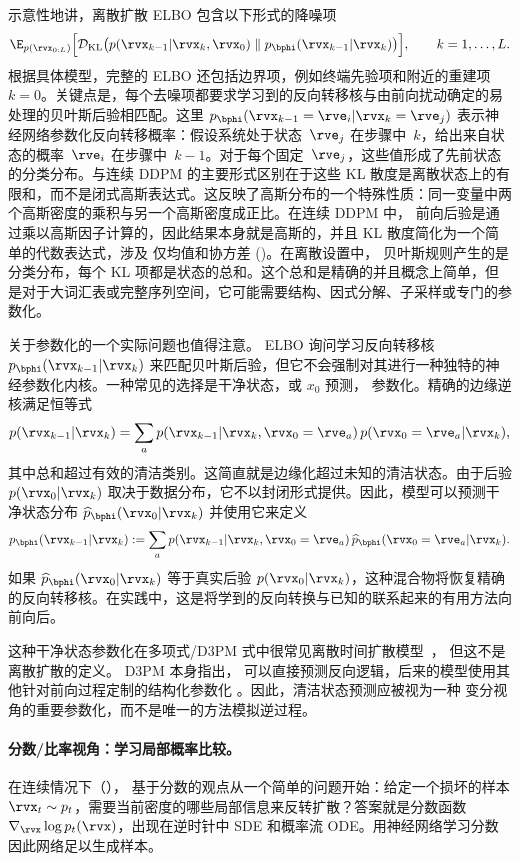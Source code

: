 示意性地讲，离散扩散 ELBO 包含以下形式的降噪项
\[
\E_{p(\rvx_{0:L})}
 \Big[
\mathcal{D}_{\mathrm{KL}} \big(
  p(\rvx_{k-1}|\rvx_k, \rvx_0)
  \;\|\;
  p_{\bphi}(\rvx_{k-1}|\rvx_k)
\big)
\Big],
\qquad k=1,\ldots,L.
\]
根据具体模型，完整的 ELBO 还包括边界项，例如终端先验项和附近的重建项 $k=0$。关键点是，每个去噪项都要求学习到的反向转移核与由前向扰动确定的易处理的贝叶斯后验相匹配。这里 $p_{\bphi}(\rvx_{k-1}=\rve_i|\rvx_k=\rve_j)$ 表示神经网络参数化反向转移概率：假设系统处于状态~$\rve_j$ 在步骤中~$k$，给出来自状态的概率~$\rve_i$ 在步骤中~$k{-}1$。对于每个固定~$\rve_j$，这些值形成了先前状态的分类分布。与连续 DDPM 的主要形式区别在于这些 KL 散度是离散状态上的有限和，而不是闭式高斯表达式。这反映了高斯分布的一个特殊性质：同一变量中两个高斯密度的乘积与另一个高斯密度成正比。在连续 DDPM 中，
前向后验是通过乘以高斯因子计算的，因此结果本身就是高斯的，并且
KL 散度简化为一个简单的代数表达式，涉及
仅均值和协方差 ()。在离散设置中，
贝叶斯规则产生的是分类分布，每个 KL 项都是状态的总和。这个总和是精确的并且概念上简单，但是对于大词汇表或完整序列空间，它可能需要结构、因式分解、子采样或专门的参数化。

关于参数化的一个实际问题也值得注意。 ELBO 询问学习反向转移核 $p_{\bphi}(\rvx_{k-1}|\rvx_k)$ 来匹配贝叶斯后验，但它不会强制对其进行一种独特的神经参数化内核。一种常见的选择是干净状态，或 $x_0$ 预测，
参数化。精确的边缘逆核满足恒等式
\[
p(\rvx_{k-1}|\rvx_k)
=
\sum_{a}
p(\rvx_{k-1}|\rvx_k,\rvx_0=\rve_a)\,
p(\rvx_0=\rve_a|\rvx_k),
\]
其中总和超过有效的清洁类别。这简直就是边缘化超过未知的清洁状态。由于后验 $p(\rvx_0|\rvx_k)$ 取决于数据分布，它不以封闭形式提供。因此，模型可以预测干净状态分布 $\widehat p_{\bphi}(\rvx_0|\rvx_k)$ 并使用它来定义
\[
p_{\bphi}(\rvx_{k-1}|\rvx_k)
:=
\sum_{a}
p(\rvx_{k-1}|\rvx_k,\rvx_0=\rve_a)\,
\widehat p_{\bphi}(\rvx_0=\rve_a|\rvx_k).
\]
如果 $\widehat p_{\bphi}(\rvx_0|\rvx_k)$ 等于真实后验
$p(\rvx_0|\rvx_k)$，这种混合物将恢复精确的反向转移核。在实践中，这是将学到的反向转换与已知的联系起来的有用方法向前向后。

这种干净状态参数化在多项式/D3PM 式中很常见离散时间扩散模型~\citep{hoogeboom2021argmax,austin2021structured}，
但这不是离散扩散的定义。 D3PM 本身指出，
可以直接预测反向逻辑，后来的模型使用其他针对前向过程定制的结构化参数化
\citep{sahoo2024simple}。因此，清洁状态预测应被视为一种
变分视角的重要参数化，而不是唯一的方法模拟逆过程。

\paragraph{分数/比率视角：学习局部概率比较。}
在连续情况下（），
基于分数的观点从一个简单的问题开始：给定一个损坏的样本 $\rvx_t \sim p_t$，需要当前密度的哪些局部信息来反转扩散？答案就是分数函数
$\nabla_{\rvx}\log p_t(\rvx)$，出现在逆时针中
SDE 和概率流 ODE\@。用神经网络学习分数因此网络足以生成样本。

